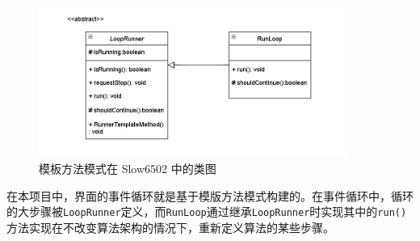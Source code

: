 \begin{figure}[h]
    \centering
    \includegraphics[width=0.9\textwidth]{figures/模板方法模式.png}
    \caption{模板方法模式在 Slow6502 中的类图}
\end{figure}

在本项目中，界面的事件循环就是基于模版方法模式构建的。在事件循环中，循环的大步骤被\lstinline{LoopRunner}定义，而\lstinline{RunLoop}通过继承\lstinline{LoopRunner}时实现其中的\lstinline{run()}方法实现在不改变算法架构的情况下，重新定义算法的某些步骤。
